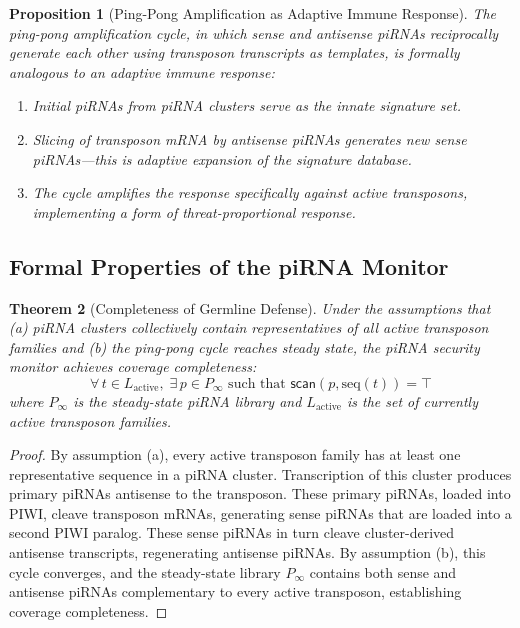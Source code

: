 \documentclass[12pt,a4paper]{article}
\newtheorem{theorem}{Theorem}[section]
\newtheorem{proposition}[theorem]{Proposition}
\theoremstyle{definition}
\begin{document}
\begin{proposition}[Ping-Pong Amplification as Adaptive Immune Response]
The ping-pong amplification cycle, in which sense and antisense piRNAs
reciprocally generate each other using transposon transcripts as
templates, is formally analogous to an \emph{adaptive immune response}:
\begin{enumerate}[label=(\roman*)]
  \item Initial piRNAs from piRNA clusters serve as the \emph{innate}
    signature set.
  \item Slicing of transposon mRNA by antisense piRNAs generates new
    sense piRNAs---this is \emph{adaptive} expansion of the signature
    database.
  \item The cycle amplifies the response specifically against
    \emph{active} transposons, implementing a form of
    threat-proportional response.
\end{enumerate}
\end{proposition}

\subsection{Formal Properties of the piRNA Monitor}

\begin{theorem}[Completeness of Germline Defense]\label{thm:pirna-complete}
Under the assumptions that (a) piRNA clusters collectively contain
representatives of all active transposon families and (b) the ping-pong
cycle reaches steady state, the piRNA security monitor achieves
\emph{coverage completeness}:
\[
  \forall\, t \in L_{\text{active}},\; \exists\, p \in P_{\infty}
  \text{ such that } \mathsf{scan}(p, \mathrm{seq}(t)) = \top
\]
where $P_{\infty}$ is the steady-state piRNA library and
$L_{\text{active}}$ is the set of currently active transposon families.
\end{theorem}

\begin{proof}
By assumption (a), every active transposon family has at least one
representative sequence in a piRNA cluster.  Transcription of this
cluster produces primary piRNAs antisense to the transposon.  These
primary piRNAs, loaded into PIWI, cleave transposon mRNAs, generating
sense piRNAs that are loaded into a second PIWI paralog.  These sense
piRNAs in turn cleave cluster-derived antisense transcripts, regenerating
antisense piRNAs.  By assumption (b), this cycle converges, and the
steady-state library $P_{\infty}$ contains both sense and antisense
piRNAs complementary to every active transposon, establishing coverage
completeness.
\end{proof}
\end{document}
